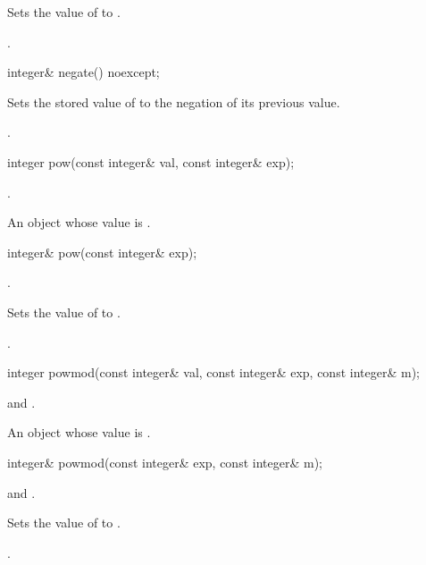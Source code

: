 \begin{itemdescr}
\effects Sets the value of  to .

\returns {}.		
\end{itemdescr}

\begin{itemdecl}
integer& negate() noexcept;	
\end{itemdecl}

\begin{itemdescr}
\effects Sets the stored value of  to the negation of its previous value.

\returns {}.		
\end{itemdescr}

\begin{itemdecl}
integer pow(const integer& val, const integer& exp);	
\end{itemdecl}

\begin{itemdescr}
\requires {}.	
	
\returns An object whose value is .		
\end{itemdescr}

\begin{itemdecl}
integer& pow(const integer& exp);	
\end{itemdecl}

\begin{itemdescr}
\requires {}.	
	
\effects Sets the value of  to .

\returns {}.		
\end{itemdescr}

\begin{itemdecl}
integer powmod(const integer& val, const integer& exp, const integer& m);	
\end{itemdecl}

\begin{itemdescr}
\requires {} and .	
	
\returns An object whose value is .		
\end{itemdescr}

\begin{itemdecl}
integer& powmod(const integer& exp, const integer& m);	
\end{itemdecl}

\begin{itemdescr}
\requires {} and .	
		
\effects Sets the value of  to .

\returns {}. 	
\end{itemdescr}

